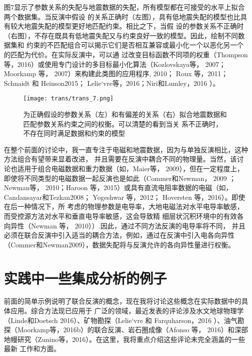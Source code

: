 图7显示了参数关系的失配与地震数据的失配，所有模型都在可接受的水平上拟合两个数据集。当反演中假设 的关系正确时（左图），具有低地震失配的模型也比具有较大地震失配的模型更好地匹配约束。相比之下，当假 设的参数关系不正确时（右图），不存在既具有低地震失配又与约束良好一致的模型。因此，绘制不同数据集和 约束的不匹配组合可以揭示它们是否相互兼容或最小化一个以恶化另一个的匹配为代价。在实际反演中，可以通 过改变目标函数不同项的权重（Thompson 等，2016）或使用专门设计的多目标最小化算法（Kozlovskaya等， 2007；Moorkamp 等， 2007）来构建此类图的应用程序, 2010； Roux 等，2011； Schnaidt 和 Heinson2015； Lelie`vre等，2016；Niri和Lumley，2016 ）。

\begin{figure}[H]
    \centering
    \texttt{[image: trans/trans\_7.png]}
    \setcounter{figure}{6}
    \caption{为正确假设的参数关系（左）和有偏差的关系（右）拟合地震数据和匹配参数关系约束之间的权衡。可以清楚的看到当关 系不正确时，不存在同时满足数据和约束的模型} \label{trans7}

\end{figure}

在整个前面的讨论中，我一直专注于电磁和地震数据，因为与单独反演相比，这种方法组合有望带来显着改进， 并且需要在反演中耦合不同的物理量。当然，该讨论也适用于组合电磁数据和重力数据（如，Maier等， 2009），但在一定程度上，即使将不同类型的电磁数据一起反演也是如此（Commer和Newman， 2009 ； Newman等， 2010；Haroon 等，2015）或具有直流电阻率数据的电磁（如， Candansayar和Tezkan2008； Yogeshwar 等，2012； Hoversten 等，2016）。即使在后一种情况下，所 考虑的物理参数是电导率，大地电磁法对水平电导率敏感，而受控源方法对水平和垂直电导率敏感，这会导致精 细层状沉积环境中的有效各向异性（Newman 等， 2010））.因此，通过不同方法反演的电导率将不同， 并且必须在联合反演中引入适当的耦合方法，例如，通过在反演中引入电各向异性（Commer和Newman2009），数据失配将与反演允许的各向异性量进行权衡。

\section{实践中一些集成分析的例子}

前面的简单示例说明了联合反演的概念，现在我将讨论这些概念在实际数据中的具体应用。综合方法现已应用于 广泛的领域，最近发表的评论涉及水文地球物理学（Linde和Doetsch 2016）、矿物勘探（Lelie`vre 和 Farquharson，2016 ）、油气勘探（Moorkamp等，2016b）的联合反演、岩石圈成像（Afonso 等， 2016）和深部地幔研究（Zunino等，2016）。在这里，我将重点介绍这些评论未完全涵盖的一些最新 工作和方面。

